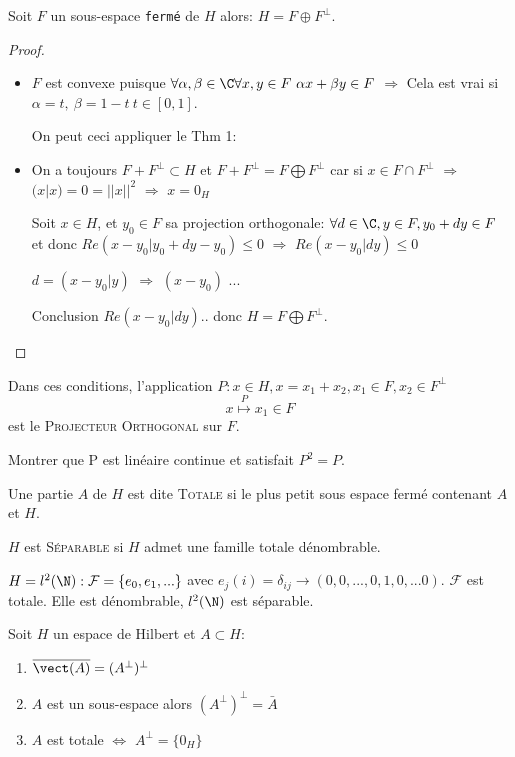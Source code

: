 \begin{theorem}[corollaire]
	Soit $F$ un sous-espace \texttt{fermé} de $H$ alors: $H=F\oplus F^\perp$.
\end{theorem}
\begin{proof}
	\begin{itemize}
		\item $F$ est convexe puisque $\forall \alpha,\beta\in\C \forall x, y\in F\ \alpha x+\beta y\in F$ $\Rightarrow$ Cela est vrai si $\alpha = t,\ \beta=1-t\ t\in[0,1]$.
	
	On peut ceci appliquer le Thm 1:
		\item On a toujours $F+F^\perp \subset H$ et $F+F^\perp = F\bigoplus F^\perp$ car si $x\in F\cap F^\perp$ $\Rightarrow$ $(x|x)=0=||x||^2$ $\Rightarrow$ $x=0_H$
		
		Soit $x\in H$, et $y_0\in F$ sa projection orthogonale: $\forall d\in \C, y\in F, y_0+dy\in F$ et donc $Re(x-y_0| y_0+dy-y_0)\leq 0$ $\Rightarrow$ $Re(x-y_0|dy)\leq 0$
		
		$d=(x-y_0|y)$ $\Rightarrow$ $(x-y_0)$
		...
		
	Conclusion $Re(x-y_0|dy)$.. donc $H=F\bigoplus F^\perp$.
	\end{itemize}
\end{proof}

\begin{definition}
	Dans ces conditions, l'application $P:x\in H, x=x_1+x_2, x_1\in F, x_2\in F^\perp $ $$x \overset{P}{\mapsto} x_1\in F$$ est le \textsc{Projecteur Orthogonal} sur $F$.
\end{definition}

\begin{examplebox}
	Montrer que P est linéaire continue et satisfait $P^2=P$.
\end{examplebox}

\begin{definition}
	Une partie $A$ de $H$ est dite \textsc{Totale} si le plus petit sous espace fermé contenant $A$ et $H$.

	$H$ est \textsc{Séparable} si $H$ admet une famille totale dénombrable.
\end{definition}

\begin{examplebox}
	$H=l^2(\N): \mathcal{F}=\{e_0, e_1, ...\}$ avec $e_j(i)=\delta_{ij}\to (0,0,..., 0,1,0,... 0)$. $\mathcal{F}$ est totale. Elle est dénombrable, $l^2(\N)$ est séparable.
\end{examplebox}

\begin{theorem}
	Soit $H$ un espace de Hilbert et $A\subset H$:
	\begin{enumerate}
		\item $\overline{\vect(A)}=(A^\perp)^\perp$
		\item $A$ est un sous-espace alors $(A^\perp)^\perp=\bar A$
		\item $A$ est totale $\Leftrightarrow$ $A^\perp=\{0_H\}$
	\end{enumerate}
\end{theorem}

